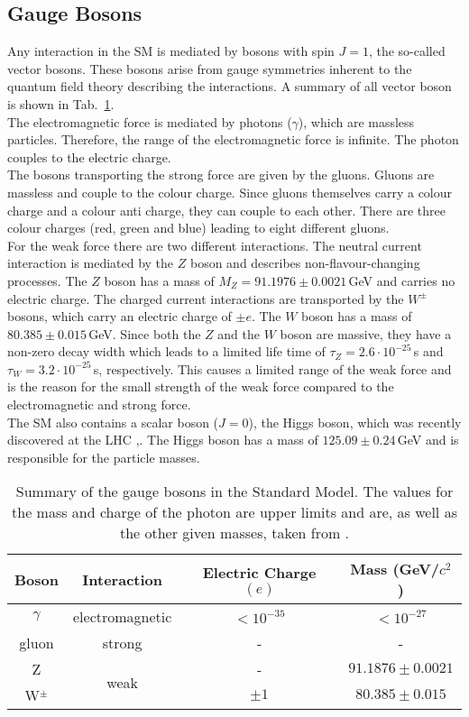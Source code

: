 \subsection{Gauge Bosons}
Any interaction in the SM is mediated by bosons with spin $J=1$, the so-called vector bosons. These bosons arise from gauge symmetries inherent to the quantum field theory describing the interactions. A summary of all vector boson is shown in Tab.~\ref{tab:theo:bosons}.\\
The electromagnetic force is mediated by photons ($\gamma$), which are massless particles. Therefore, the range of the electromagnetic force is infinite. The photon couples to the electric charge.\\
The bosons transporting the strong force are given by the gluons. Gluons are massless and couple to the colour charge. Since gluons themselves carry a colour charge and a colour anti charge, they can couple to each other. There are three colour charges (red, green and blue) leading to eight different gluons.\\
For the weak force there are two different interactions. The neutral current interaction is mediated by the $Z$ boson and describes non-flavour-changing processes. The $Z$ boson has a mass of $M_Z=91.1976 \pm 0.0021$\,GeV \cite{SMmasses} and carries no electric charge. The charged current interactions are transported by the $W^\pm$ bosons, which carry an electric charge of $\pm e$. The $W$ boson has a mass of $80.385 \pm 0.015$\,GeV. Since both the $Z$ and the $W$ boson are massive, they have a non-zero decay width which leads to a limited life time of $\tau_Z=2.6\cdot 10^{-25}$\,s and $\tau_W=3.2\cdot 10^{-25}$\,s, respectively. This causes a limited range of the weak force and is the reason for the small strength of the weak force compared to the electromagnetic and strong force.\\ 
The SM also contains a scalar boson ($J=0$), the Higgs boson, which was recently discovered at the LHC \cite{cms_higgsdiscov},\cite{atlas_higgsdiscov}. The Higgs boson has a mass of $125.09 \pm 0.24$\,GeV and is responsible for the particle masses.\\

\begin{table}
	\centering
	\caption[Summary of the gauge bosons in the Standard Model.]{Summary of the gauge bosons in the Standard Model. The values for the mass and charge of the photon are upper limits and are, as well as the other given masses, taken from \cite{SMmasses}.}
	\label{tab:theo:bosons}
	\begin{tabular}{cccc}
	\hline
	Boson & Interaction & Electric Charge $(e)$ & Mass (GeV/$c^2$) \\
	\hline
	$\gamma$ & electromagnetic & $<10^{-35}$ & $<10^{-27}$ \\
	gluon & strong & - & - \\
	Z & \multirow{2}{*}{weak} & - & $91.1876 \pm 0.0021$ \\
	W$^\pm$ & & $\pm 1$ & $80.385 \pm 0.015$ \\
	\hline
	\end{tabular}
\end{table}
